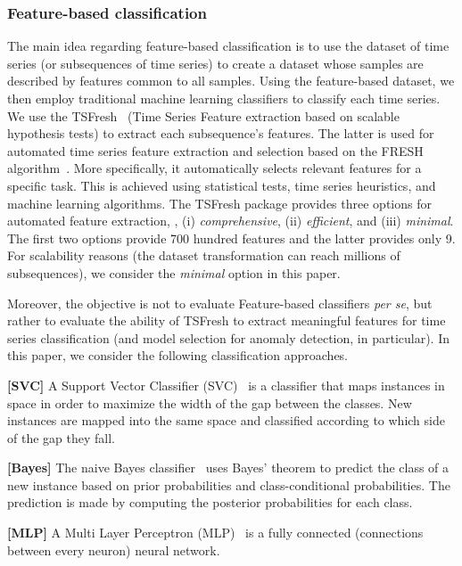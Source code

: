 \subsubsection{Feature-based classification}
The main idea regarding feature-based classification is to use the dataset of time series (or subsequences of time series) to create a dataset whose samples are described by features common to all samples. Using the feature-based dataset, we then employ traditional machine learning classifiers to classify each time series. We use the TSFresh~\cite{CHRIST201872} (Time Series Feature extraction based on scalable hypothesis tests) to extract each subsequence's features. The latter is used for automated time series feature extraction and selection based on the FRESH algorithm~\cite{christ2016distributed}. More specifically, it automatically selects relevant features for a specific task. This is achieved using statistical tests, time series heuristics, and machine learning algorithms. 
The TSFresh package provides three options for automated feature extraction, , (i) \textit{ comprehensive}, (ii) \textit{ efficient}, and (iii) \textit{ minimal}. The first two options provide 700 hundred features and the latter provides only 9. For scalability reasons (the dataset transformation can reach millions of subsequences), we consider the \textit{minimal} option in this paper.

Moreover, the objective is not to evaluate Feature-based classifiers \textit{per se}, but rather to evaluate the ability of TSFresh to extract meaningful features for time series classification (and model selection for anomaly detection, in particular). In this paper, we consider the following classification approaches.

\noindent\textbf{[SVC]}
A Support Vector Classifier (SVC)~\cite{10.1145/130385.130401} is a classifier that maps instances in space in order to maximize the width of the gap between the classes. New instances are mapped into the same space and classified according to which side of the gap they fall. 

\noindent\textbf{[Bayes]}
The naive Bayes classifier~\cite{Zhang2004TheOO} uses Bayes' theorem to predict the class of a new instance based on prior probabilities and class-conditional probabilities. The prediction is made by computing the posterior probabilities for each class.

\noindent\textbf{[MLP]}
A Multi Layer Perceptron (MLP)~\cite{Hinton1989ConnectionistLP} is a fully connected (connections between every neuron) neural network.

